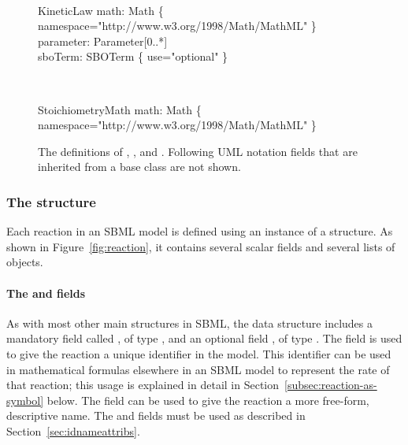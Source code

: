 \begin{figure}[htb]
  \\
  \begin{classbox}{KineticLaw}
    math: Math \{ namespace="http://www.w3.org/1998/Math/MathML" \} \\
    parameter: Parameter[0..*]                                      \\
    sboTerm: SBOTerm \{ use="optional" \}             \\
  \end{classbox}
  \\[2ex]
  \begin{classbox}{StoichiometryMath}  
    math: Math \{ namespace="http://www.w3.org/1998/Math/MathML" \} \\
  \end{classbox}
  \caption{The definitions of \Reaction, \KineticLaw,
    \SpeciesReference and \ModifierSpeciesReference.
    Following UML notation fields
    that are inherited from a base class are not shown.}
  \label{fig:reaction}
\end{figure}


\subsubsection{The  structure}
\label{sec:reaction-type}

Each reaction in an SBML model is defined using an instance of a
\Reaction structure.  As shown in Figure~\vref{fig:reaction}, it
contains several scalar fields and several lists of objects.


\paragraph{The  and  fields}

As with most other main structures in SBML, the \Reaction data
structure includes a mandatory field called , of type
, and an optional field , of type
.  The  field is used to give the
reaction a unique identifier in the model.  This identifier can be
used in mathematical formulas elsewhere in an SBML model to
represent the rate of that reaction; this usage is explained in
detail in Section~\ref{subsec:reaction-as-symbol} below.  The
 field can be used to give the reaction a more
free-form, descriptive name.  The  and 
fields must be used as described in
Section~\ref{sec:idnameattribs}.


